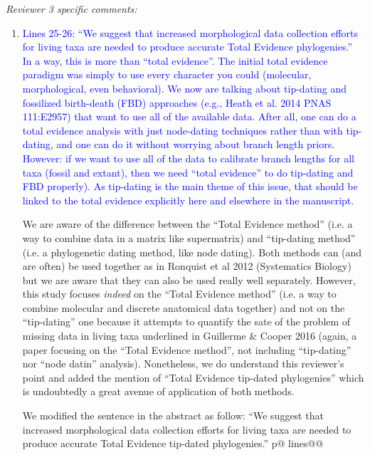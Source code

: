 \documentclass[12pt,letterpaper]{article}
\renewcommand{\subsection}[1]{%
\bigskip
\begin{center}
\begin{large}
\normalfont\itshape #1
\end{large}
\end{center}}
\begin{document}
\subsection{Reviewer 3 specific comments:}
\begin{enumerate}
\item{\textcolor{blue}{Lines 25-26: ``We suggest that increased morphological data collection efforts for living taxa are needed to produce accurate Total Evidence phylogenies.''
In a way, this is more than ``total evidence''.
The initial total evidence paradigm was simply to use every character you could (molecular, morphological, even behavioral).
We now are talking about tip-dating and fossilized birth-death (FBD) approaches (e.g., Heath et al. 2014 PNAS 111:E2957) that want to use all of the available data.
After all, one can do a total evidence analysis with just node-dating techniques rather than with tip-dating, and one can do it without worrying about branch length priors.
However: if we want to use all of the data to calibrate branch lengths for all taxa (fossil and extant), then we need ``total evidence'' to do tip-dating and FBD properly).
As tip-dating is the main theme of this issue, that should be linked to the total evidence explicitly here and elsewhere in the manuscript.}}

We are aware of the difference between the ``Total Evidence method'' (i.e. a way to combine data in a matrix like supermatrix) and ``tip-dating method'' (i.e. a phylogenetic dating method, like node dating).
Both methods can (and are often) be used together as in Ronquist et al 2012 (Systematics Biology) but we are aware that they can also be used really well separately.
However, this study focuses \textit{indeed} on the ``Total Evidence method'' (i.e. a way to combine molecular and discrete anatomical data together) and not on the ``tip-dating'' one because it attempts to quantify the sate of the problem of missing data in living taxa underlined in Guillerme \& Cooper 2016 (again, a paper focusing on the ``Total Evidence method'', not including ``tip-dating'' nor ``node datin'' analysis).
Nonetheless, we do understand this reviewer's point and added the mention of ``Total Evidence tip-dated phylogenies'' which is undoubtedly a great avenue of application of both methods.

We modified the sentence in the abstract as follow: ``We suggest that increased morphological data collection efforts for living taxa are needed to produce accurate Total Evidence tip-dated phylogenies.'' p@ lines@@


\end{enumerate}
\end{document}
